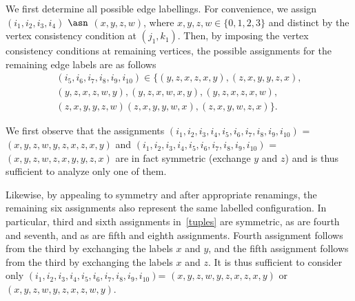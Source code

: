 
We first determine all possible edge labellings. For convenience,
we assign $(i_1,i_2,i_3,i_4)$ $\asn$ $(x,y,z,w)$, where $x,y,z,w
\in \{0,1,2,3 \}$ and distinct by the vertex consistency condition
at $(j_1,k_1)$. Then, by imposing the vertex consistency
conditions at remaining vertices, the possible assignments for the
remaining edge labels are as follows
\begin{equation}\label{tuples}\begin{array}{cccccc} (i_5,i_6,i_7,i_8,i_9,i_{10}) \in
 \{(y,z,x,z,x,y), (z,x,y,y,z,x),  \\
 (y,z,x,z,w,y),
(y,z,x,w,x,y),  (y,z,x,z,x,w),\\(z,x,y,y,z,w)
(z,x,y,y,w,x),(z,x,y,w,z,x) \}. \end{array}\end{equation}

We first observe that the assignments
$(i_1,i_2,i_3,i_4,i_5,i_6,i_7,i_8,i_9,i_{10})$
=$(x,y,z,w,y,z,x,z,x,y)$ and
$(i_1,i_2,i_3,i_4,i_5,i_6,i_7,i_8,i_9,i_{10})$
=$(x,y,z,w,z,x,y,y,z,x)$ are in fact symmetric (exchange $y$ and
$z$) and is thus sufficient to analyze only one of them.

Likewise, by appealing to symmetry and after appropriate
renamings, the remaining six assignments also represent the same
labelled configuration. In particular, third and sixth assignments
in~\eqref{tuples} are symmetric,  as are fourth and seventh, and
as are fifth and eighth assignments. Fourth assignment follows
from the third by exchanging the labels $x$ and $y$, and the fifth
assignment follows from the third by exchanging the labels $x$ and
$z$. It is thus sufficient to consider only
$(i_1,i_2,i_3,i_4,i_5,i_6,i_7,i_8,i_9,i_{10})$=
$(x,y,z,w,y,z,x,z,x,y)$ or $(x,y,z,w,y,z,x,z,w,y)$.

